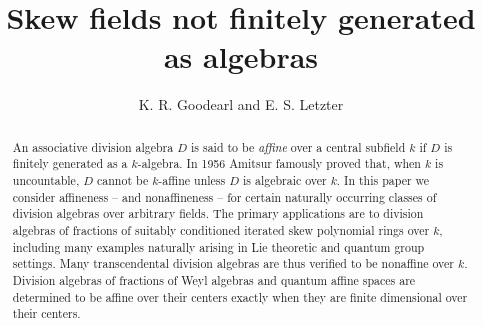 \documentclass{conm-p-l}
\theoremstyle{definition}
\theoremstyle{remark}
\numberwithin{equation}{section}
\begin{document}
\title[Nonaffine skew fields]{Skew fields not
finitely generated as algebras}

\author{K. R. Goodearl and E. S. Letzter}

\address{Department of Mathematics\\ University of California \\Santa
  Barbara, CA 93106}


\address{Department of Mathematics\\
        Temple University \\ Philadelphia, PA 19122}
      

\begin{abstract} An associative division algebra $D$ is said to be \emph{affine} over a central subfield $k$ if $D$ is finitely generated as a $k$-algebra. In 1956 Amitsur famously proved that, when $k$ is uncountable, $D$ cannot be $k$-affine unless $D$ is algebraic over $k$. In this paper we consider affineness -- and nonaffineness -- for certain naturally occurring classes of division algebras over arbitrary fields. The primary applications are to division algebras of fractions of suitably conditioned iterated skew polynomial rings over $k$, including many examples naturally arising in Lie theoretic and quantum group settings.  Many transcendental division algebras are thus verified to be nonaffine over $k$.  Division algebras of fractions of Weyl algebras and quantum affine spaces are determined to be affine over their centers exactly when they are finite dimensional over their centers.
\end{abstract}



 
\end{document}
